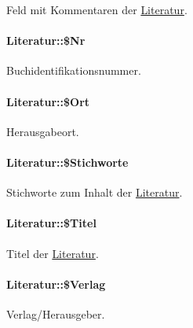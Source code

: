 Feld mit Kommentaren der \hyperlink{classLiteratur}{Literatur}. 

\hypertarget{classLiteratur_036a682a93a5d50839c1ebc70a79d4b6}{
\paragraph[\$Nr]{\setlength{\rightskip}{0pt plus 5cm}Literatur::\$Nr}\hfill}
\label{classLiteratur_036a682a93a5d50839c1ebc70a79d4b6}


Buchidentifikationsnummer. 

\hypertarget{classLiteratur_da6c458bb229187efea8e8f144a1d279}{
\paragraph[\$Ort]{\setlength{\rightskip}{0pt plus 5cm}Literatur::\$Ort}\hfill}
\label{classLiteratur_da6c458bb229187efea8e8f144a1d279}


Herausgabeort. 

\hypertarget{classLiteratur_aa77f0f697d4bcf72279aadedd91ddff}{
\paragraph[\$Stichworte]{\setlength{\rightskip}{0pt plus 5cm}Literatur::\$Stichworte}\hfill}
\label{classLiteratur_aa77f0f697d4bcf72279aadedd91ddff}


Stichworte zum Inhalt der \hyperlink{classLiteratur}{Literatur}. 

\hypertarget{classLiteratur_e30f9e9db9b396e6f87adfdb94e12ba0}{
\paragraph[\$Titel]{\setlength{\rightskip}{0pt plus 5cm}Literatur::\$Titel}\hfill}
\label{classLiteratur_e30f9e9db9b396e6f87adfdb94e12ba0}


Titel der \hyperlink{classLiteratur}{Literatur}. 

\hypertarget{classLiteratur_5f591208e5d21bb81e6c51484e2a60e0}{
\paragraph[\$Verlag]{\setlength{\rightskip}{0pt plus 5cm}Literatur::\$Verlag}\hfill}
\label{classLiteratur_5f591208e5d21bb81e6c51484e2a60e0}


Verlag/Herausgeber. 

